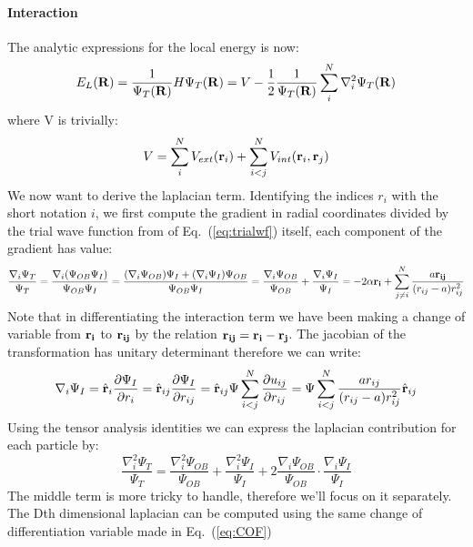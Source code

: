 \documentclass[10pt,a4paper,titlepage]{article}
\begin{document}
 \paragraph{Interaction} The  analytic expressions for the local energy is now:
 \begin{equation}
    E_L({\bf R})=\frac{1}{\Psi_T({\bf R})}H\Psi_T({\bf R})=V - \frac{1}{2}\frac{1}{\Psi_T({\bf R})}\sum_i^{N}\nabla_i^2\Psi_T({\bf R})
    \label{eq:locale}
 \end{equation}
where V is trivially:
 \begin{equation}
V = \sum_i^{N}V_{ext}({\bf{r}}_i) + \sum_{i<j}^{N} V_{int}({\bf{r}}_i,{\bf{r}}_j)
\end{equation}
We now want to derive the laplacian term. Identifying the indices $r_i$ with the short notation $i$, we first compute the gradient in radial coordinates divided by the trial wave function from of Eq.~(\ref{eq:trialwf}) itself, each component of the gradient has value:
\begin{equation}
\frac{\nabla_{i} \Psi_T}{\Psi_T} =\frac{\nabla_{i} (\Psi_{OB}\Psi_{I})}{\Psi_{OB}\Psi_{I}} = \frac{(\nabla_{i}\Psi_{OB}) \Psi_{I}+(\nabla_{i}\Psi_{I}) \Psi_{OB}}{\Psi_{OB}\Psi_{I}} =  \frac{\nabla_{i} \Psi_{OB}}{\Psi_{OB}} +\frac{\nabla_{i} \Psi_I}{\Psi_I} = - 2 \alpha {\bf r_i} + \sum_{j\neq i}^N \frac{a {\bf r_{ij}}}{(r_{ij}-a )r^2_{ij}}
\label{eq:gradiente}
\end{equation} 
Note that in differentiating the interaction term we have been making a change of variable from $\bf r_i$ to $\bf r_{ij}$ by the relation $\bf r_{ij}=r_i - r_j$. The jacobian of the transformation has unitary determinant therefore we can write:
\begin{equation}
\nabla_{i} \Psi_I=\hat{\bf r}_i\frac{\partial \Psi_I}{\partial r_i}=\hat{\bf r}_{ij}\frac{\partial \Psi_I}{\partial r_{ij}}=\hat{\bf r}_{ij} \Psi\sum_{i<j}^N\frac{\partial u_{ij}}{\partial r_{ij}} = \Psi\sum_{i<j}^N \frac{ar_{ij}}{(r_{ij}-a )r^2_{ij}}\hat{\bf r}_{ij}
\label{eq:COF}
\end{equation}
Using the tensor analysis identities we can express the laplacian contribution for each particle by:
\begin{equation}
\frac{\nabla^2_{i} \Psi_T}{\Psi_T} = \frac{\nabla^2_{i} \Psi_{OB}}{\Psi_{OB}} +\frac{\nabla^2_{i} \Psi_I}{\Psi_I} + 2\frac{\nabla_{i} \Psi_{OB}}{\Psi_{OB}} \cdot \frac{\nabla_{i} \Psi_I}{\Psi_I}
\end{equation}
The middle term is more tricky to handle, therefore we'll focus on it separately. The Dth dimensional laplacian can be computed using the same change of differentiation variable made in Eq.~(\ref{eq:COF})
\end{document}
